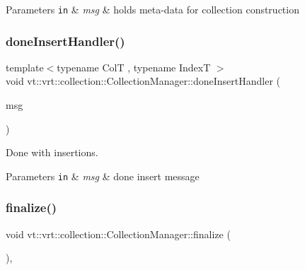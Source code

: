 \begin{DoxyParams}[1]{Parameters}
\mbox{\tt in}  & {\em msg} & holds meta-\/data for collection construction \\
\hline
\end{DoxyParams}
\mbox{\label{structvt_1_1vrt_1_1collection_1_1_collection_manager_ad0d2174c1605c18dfdc028679f1505ae}} 
\subsubsection{\texorpdfstring{done\+Insert\+Handler()}{doneInsertHandler()}}
{\footnotesize\ttfamily template$<$typename ColT , typename IndexT $>$ \\
void vt\+::vrt\+::collection\+::\+Collection\+Manager\+::done\+Insert\+Handler (\begin{DoxyParamCaption}\item[{\hyperlink{structvt_1_1vrt_1_1collection_1_1_done_insert_msg}{Done\+Insert\+Msg}$<$ ColT, IndexT $>$ $\ast$}]{msg }\end{DoxyParamCaption})\hspace{0.3cm}{\ttfamily [static]}}



Done with insertions. 


\begin{DoxyParams}[1]{Parameters}
\mbox{\tt in}  & {\em msg} & done insert message \\
\hline
\end{DoxyParams}
\mbox{\label{structvt_1_1vrt_1_1collection_1_1_collection_manager_afafcdbf36f42835471218b654252031c}} 
\subsubsection{\texorpdfstring{finalize()}{finalize()}}
{\footnotesize\ttfamily void vt\+::vrt\+::collection\+::\+Collection\+Manager\+::finalize (\begin{DoxyParamCaption}{ }\end{DoxyParamCaption})\hspace{0.3cm}{\ttfamily [override]}, {\ttfamily [virtual]}}



